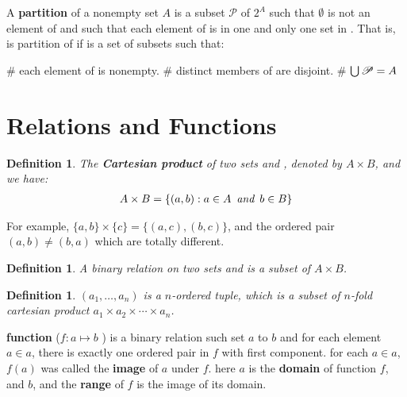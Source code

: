 A {\bf partition } of a nonempty set $A$ is a subset $\mathscr{P}$ of $2^A$ such that 
$\emptyset$ is not an element of \partitionset and such that each element of \ua is in one 
and only one set in \partitionset. That is, \partitionset is partition of \ua if \partitionset
is a set of subsets \ua such that:
\begin{easylist}[tractatus]
# each element of \partitionset is nonempty.
# distinct members of \partitionset are disjoint.
# $\bigcup\partitionset = \ua$
\end{easylist}

\section{Relations and Functions}

\newtheorem{cartesianproduct}[theorem_root]{Definition}
\begin{cartesianproduct}
The {\bf Cartesian product} of two sets \ua and \ub, denoted by $A\times B$, and we have:
\begin{align}
    A\times B = \{(a, b): a\in A \aand b\in B\}
\end{align}
\end{cartesianproduct}

For example, $\{a, b\}\times \{c\} = \{(a,c), (b,c)\}$, and the ordered pair $(a, b) \ne (b, a)$ which are totally
different.

\newtheorem{binaryrelation}[theorem_root]{Definition}
\begin{binaryrelation}
A binary relation on two sets \ua and \ub is a subset of $A\times B$.
\end{binaryrelation}

\newtheorem{orderedtuple}[theorem_root]{Definition}
\begin{orderedtuple}
$(a_1,\ldots,a_n)$ is a $n$-ordered tuple, which is a subset of $n$-fold cartesian product 
$a_1\times a_2\times\cdots\times a_n$.
\end{orderedtuple}

{\bf function} ($f: a\mapsto b$ ) is a binary relation such set $a$ to $b$ and for each element $a\in a$, there
is exactly one ordered pair in $f$ with first component. 
for each $a\in a$, $f(a)$ was called the {\bf image} of $a$ under $f$.
here $a$ is the {\bf domain} of function $f$, and
$b$, and the {\bf range} of $f$ is the image of its domain.

